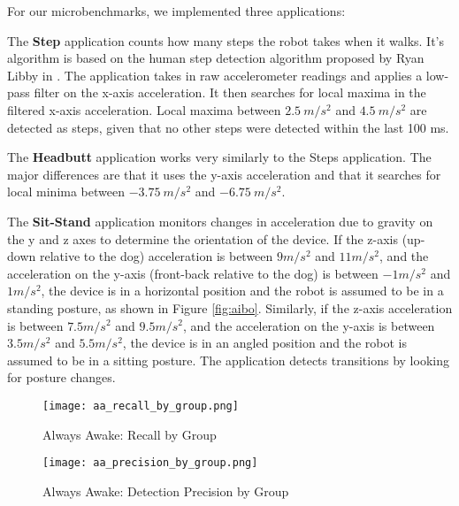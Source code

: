 
For our microbenchmarks, we implemented three applications:

The \textbf{Step} application counts how many steps the robot takes when it walks. It's algorithm is based on the human step detection algorithm proposed by Ryan Libby in \cite{libbyFootstepDetection}. The application takes in raw accelerometer readings and applies a low-pass filter on the x-axis acceleration. It then searches for local maxima in the filtered x-axis acceleration. Local maxima between $2.5\:m/s^2$ and $4.5\:m/s^2$ are detected as steps, given that no other steps were detected within the last 100 ms.

The \textbf{Headbutt} application works very similarly to the Steps application. The major differences are that it uses the y-axis acceleration and that it searches for local minima between $-3.75\:m/s^2$ and $-6.75\:m/s^2$.

The \textbf{Sit-Stand} application monitors changes in acceleration due to gravity on the y and z axes to determine the orientation of the device. If the z-axis (up-down relative to the dog) acceleration is between $9 m/s^2$ and $11 m/s^2$, and the acceleration on the y-axis (front-back relative to the dog) is between $-1 m/s^2$ and $1 m/s^2$, the device is in a horizontal position and the robot is assumed to be in a standing posture, as shown in Figure \ref{fig:aibo}. Similarly, if the z-axis acceleration is between $7.5 m/s^2$ and $9.5 m/s^2$, and the acceleration on the y-axis is between $3.5 m/s^2$ and $5.5 m/s^2$, the device is in an angled position and the robot is assumed to be in a sitting posture. The application detects transitions by looking for posture changes.

\begin{figure}[t]
	\texttt{[image: aa\_recall\_by\_group.png]}
	\caption{Always Awake: Recall by Group}
    	\label{fig:aaRecallByGroup}
\end{figure}


\begin{figure}[t]
	\texttt{[image: aa\_precision\_by\_group.png]}
	\caption{Always Awake: Detection Precision by Group}
    	\label{fig:aaPrecisionByGroup}
\end{figure}

